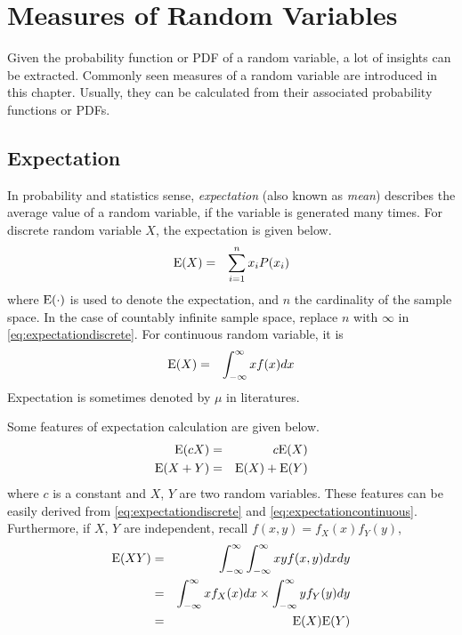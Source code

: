 \chapter{Measures of Random Variables} \label{ch:measuresdistribution}

Given the probability function or PDF of a random variable, a lot of insights can be extracted. Commonly seen measures of a random variable are introduced in this chapter. Usually, they can be calculated from their associated probability functions or PDFs.

\section{Expectation}

In probability and statistics sense, \textit{expectation} (also known as \textit{mean}) describes the average value of a random variable, if the variable is generated many times. For discrete random variable $X$, the expectation is given below.
\begin{eqnarray}
  \textup{E}(X) &=& \sum_{i=1}^{n}x_iP(x_i) \label{eq:expectationdiscrete}
\end{eqnarray}
where $\textup{E}(\cdot)$ is used to denote the expectation, and $n$ the cardinality of the sample space. In the case of countably infinite sample space, replace $n$ with $\infty$ in \eqref{eq:expectationdiscrete}. For continuous random variable, it is
\begin{eqnarray}
  \textup{E}(X) &=& \int_{-\infty}^{\infty}xf(x)dx \label{eq:expectationcontinuous}
\end{eqnarray}
Expectation is sometimes denoted by $\mu$ in literatures.

Some features of expectation calculation are given below.
\begin{eqnarray}
  \textup{E}(cX) &=& c\textup{E}(X) \nonumber \\
  \textup{E}(X+Y) &=& \textup{E}(X) + \textup{E}(Y) \nonumber
\end{eqnarray}
where $c$ is a constant and $X$, $Y$ are two random variables. These features can be easily derived from \eqref{eq:expectationdiscrete} and \eqref{eq:expectationcontinuous}. Furthermore, if $X$, $Y$ are independent, recall $f(x,y) = f_X(x)f_Y(y)$,
\begin{eqnarray}
  \textup{E}(XY) &=& \int_{-\infty}^{\infty}\int_{-\infty}^{\infty} xyf(x, y)dxdy \nonumber \\
  &=& \int_{-\infty}^{\infty}xf_X(x)dx \times \int_{-\infty}^{\infty}yf_Y(y)dy \nonumber \\
  &=& \textup{E}(X)\textup{E}(Y) \nonumber
\end{eqnarray}

